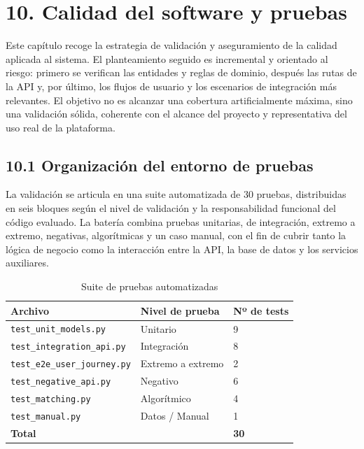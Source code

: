 \section*{10. Calidad del software y pruebas}
\label{cap:calidad}

Este capítulo recoge la estrategia de validación y aseguramiento de la calidad aplicada al sistema. 
El planteamiento seguido es incremental y orientado al riesgo: primero se verifican las entidades y reglas de dominio, 
después las rutas de la API y, por último, los flujos de usuario y los escenarios de integración más relevantes.
El objetivo no es alcanzar una cobertura artificialmente máxima, sino una validación sólida, coherente con el alcance del proyecto y representativa del uso real de la plataforma.


\subsection{10.1 Organización del entorno de pruebas}
\label{sec:organizacion-pruebas}

La validación se articula en una suite automatizada de 30 pruebas, distribuidas en seis bloques según el nivel de validación y la 
responsabilidad funcional del código evaluado. La batería combina pruebas unitarias, de integración, extremo a extremo, negativas, 
algorítmicas y un caso manual, con el fin de cubrir tanto la lógica de negocio como la interacción entre la API, la base de datos y los servicios auxiliares.

\begin{table}[H]
\centering
\caption{Suite de pruebas automatizadas}
\label{tab:suite-pruebas}
\renewcommand{\arraystretch}{1.3}
\begin{tabular}{lll}
\hline
\textbf{Archivo} & \textbf{Nivel de prueba} & \textbf{Nº de tests} \\
\hline
\texttt{test\_unit\_models.py}      & Unitario          & 9 \\
\texttt{test\_integration\_api.py}  & Integración       & 8 \\
\texttt{test\_e2e\_user\_journey.py}& Extremo a extremo & 2 \\
\texttt{test\_negative\_api.py}     & Negativo          & 6 \\
\texttt{test\_matching.py}          & Algorítmico       & 4 \\
\texttt{test\_manual.py}            & Datos / Manual    & 1 \\
\hline
\textbf{Total}                      &                   & \textbf{30} \\
\hline
\end{tabular}
\end{table}

